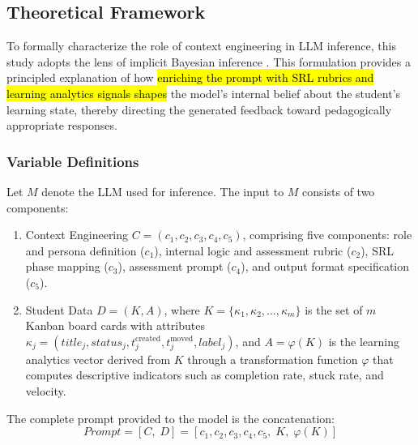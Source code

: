 \documentclass[conference,a4paper]{IEEEtran}
\begin{document}

\subsection{Theoretical Framework}\label{sec:framework}

To formally characterize the role of context engineering 
in LLM inference, this study adopts the lens of implicit 
Bayesian inference \cite{xie2022explanation}. This 
formulation provides a principled explanation of how 
\hl{enriching the prompt with SRL rubrics and learning 
analytics signals shapes} the model's internal belief 
about the student's learning state, thereby directing the 
generated feedback toward pedagogically appropriate 
responses.

\subsubsection{Variable Definitions}

Let $M$ denote the LLM used for inference. The input 
to $M$ consists of two components:

\begin{enumerate}
    \item Context Engineering 
    $C = (c_1, c_2, c_3, c_4, c_5)$, comprising five 
    components: role and persona definition ($c_1$), 
    internal logic and assessment rubric ($c_2$), SRL 
    phase mapping ($c_3$), assessment prompt ($c_4$), 
    and output format specification ($c_5$).

    \item Student Data $D = (K, A)$, where 
    $K = \{\kappa_1, \kappa_2, \ldots, \kappa_m\}$ is 
    the set of $m$ Kanban board cards with attributes 
    $\kappa_j = (\textit{title}_j, \textit{status}_j, 
    t_j^{\text{created}}, t_j^{\text{moved}}, 
    \textit{label}_j)$, and $A = \varphi(K)$ is the 
    learning analytics vector derived from $K$ through 
    a transformation function $\varphi$ that computes 
    descriptive indicators such as completion rate, 
    stuck rate, and velocity.
\end{enumerate}

The complete prompt provided to the model is the 
concatenation:
\begin{equation}\label{eq:prompt}
    \textit{Prompt} = [C,\; D] = 
    [c_1, c_2, c_3, c_4, c_5,\; K,\; \varphi(K)]
\end{equation}
\end{document}
